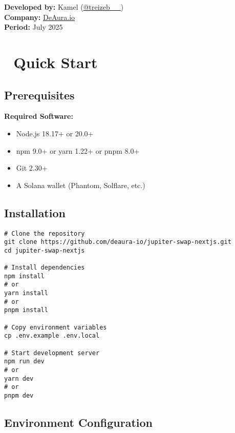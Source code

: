 \documentclass[11pt,a4paper]{article}
\begin{document}
\begin{titlepage}
    \vfill
    
    {\large\textbf{Developed by:} Kamel (\href{https://x.com/treizeb__}{@treizeb\_\_})\\
    \textbf{Company:} \href{https://deaura.io}{DeAura.io}\\
    \textbf{Period:} July 2025\par}
\end{titlepage}

\newpage
\tableofcontents
\newpage

\section{🚀 Quick Start}

\subsection{Prerequisites}

\begin{tcolorbox}[colback=warningOrange!10,colframe=warningOrange]
\textbf{Required Software:}
\begin{itemize}
    \item Node.js 18.17+ or 20.0+
    \item npm 9.0+ or yarn 1.22+ or pnpm 8.0+
    \item Git 2.30+
    \item A Solana wallet (Phantom, Solflare, etc.)
\end{itemize}
\end{tcolorbox}

\subsection{Installation}

\begin{lstlisting}[style=bash, caption=Installation Commands]
# Clone the repository
git clone https://github.com/deaura-io/jupiter-swap-nextjs.git
cd jupiter-swap-nextjs

# Install dependencies
npm install
# or
yarn install
# or
pnpm install

# Copy environment variables
cp .env.example .env.local

# Start development server
npm run dev
# or
yarn dev
# or
pnpm dev
\end{lstlisting}

\subsection{Environment Configuration}
\end{document}
